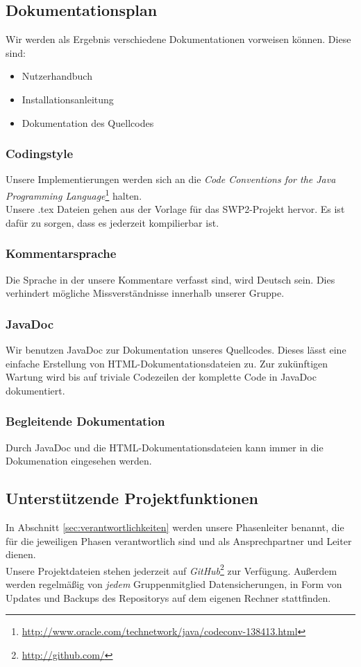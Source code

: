 \documentclass[fontsize=12pt,paper=a4,twoside]{scrartcl}
\begin{document}
\subsection{Dokumentationsplan}
Wir werden als Ergebnis verschiedene Dokumentationen vorweisen können. Diese sind:

\begin{itemize}
\item{Nutzerhandbuch}
\item{Installationsanleitung}
\item{Dokumentation des Quellcodes}
\end{itemize}

\subsubsection{Codingstyle}
Unsere Implementierungen werden sich an die \emph{Code Conventions for the Java Programming Language}\footnote{\url{http://www.oracle.com/technetwork/java/codeconv-138413.html}} halten.\\
Unsere .tex Dateien gehen aus der Vorlage für das SWP2-Projekt hervor. Es ist dafür zu sorgen, dass es jederzeit kompilierbar ist.

\subsubsection{Kommentarsprache}
Die Sprache in der unsere Kommentare verfasst sind, wird Deutsch sein. Dies verhindert mögliche Missverständnisse innerhalb unserer Gruppe.

\subsubsection{JavaDoc}
Wir benutzen JavaDoc zur Dokumentation unseres Quellcodes. Dieses lässt eine einfache Erstellung von HTML-Dokumentationsdateien zu.
Zur zukünftigen Wartung wird bis auf triviale Codezeilen der komplette Code in JavaDoc dokumentiert.

\subsubsection{Begleitende Dokumentation}
Durch JavaDoc und die HTML-Dokumentationsdateien kann immer in die Dokumenation eingesehen werden.

\subsection{Unterstützende Projektfunktionen}
In Abschnitt \ref{sec:verantwortlichkeiten} werden unsere Phasenleiter benannt, die für die jeweiligen Phasen verantwortlich sind und als Ansprechpartner und Leiter dienen.\\
Unsere Projektdateien stehen jederzeit auf \emph{GitHub}\footnote{\url{http://github.com/}} zur Verfügung. Außerdem werden regelmäßig von \emph{jedem} Gruppenmitglied Datensicherungen, in Form von Updates und Backups des Repositorys auf dem eigenen Rechner stattfinden.
\end{document}
